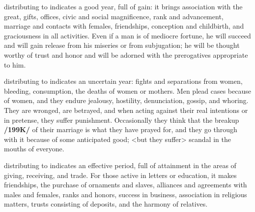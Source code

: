 \Venus\xspace distributing to \Jupiter\xspace indicates a good year, full of gain: it brings association with the great,
gifts, offices, civic and social magnificence, rank and advancement, marriage and contacts with females, friendships, conception and childbirth, and graciousness in all activities. Even if a man is of mediocre fortune, he will succeed and will gain release from his miseries or from subjugation; he will be thought worthy of trust and honor and will be adorned with the prerogatives appropriate to him.

\Venus\xspace distributing to \Mars\xspace indicates an uncertain year: fights and separations from women, bleeding,
consumption, the deaths of women or mothers. Men plead cases because of women, and they endure jealousy, hostility, denunciation, gossip, and whoring. They are wronged, are betrayed, and when acting against their real intentions or in pretense, they suffer punishment. Occasionally they think that the breakup \textbf{/199K/} of their marriage is what they have prayed for, and they go through with it because of some
anticipated good; <but they suffer> scandal in the mouths of everyone.
\enlargethispage{2\baselineskip}

\Venus\xspace distributing to \Mercury\xspace indicates an effective period, full of attainment in the areas of giving,
receiving, and trade. For those active in letters or education, it makes friendships, the purchase of ornaments and slaves, alliances and agreements with males and females, ranks and honors, success in business, association in religious matters, trusts consisting of deposits, and the harmony of relatives.

\newpage